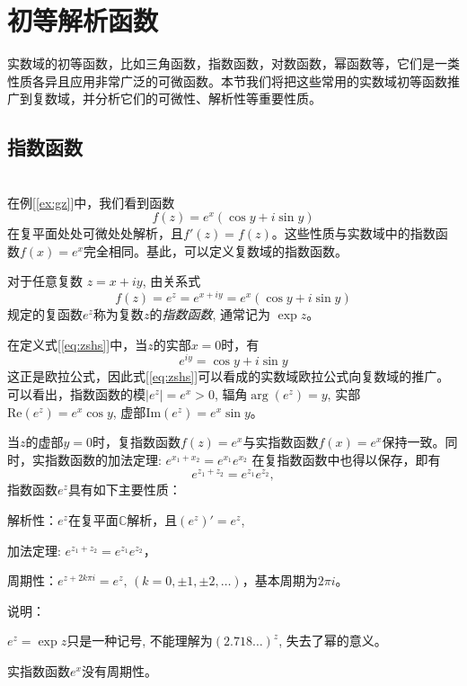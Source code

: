 \section{初等解析函数}\label{}
实数域的初等函数，比如三角函数，指数函数，对数函数，幂函数等，它们是一类性质各异且应用非常广泛的可微函数。本节我们将把这些常用的实数域初等函数推广到复数域，并分析它们的可微性、解析性等重要性质。\\

\subsection{指数函数}
~\\
在例[\ref{ex:gz}]中，我们看到函数
\[ f(z) = e^x (\cos y + i \sin y) \]
在复平面处处可微处处解析，且$f'(z) = f(z)$。这些性质与实数域中的指数函数$f(x) = e^x$完全相同。基此，可以定义复数域的指数函数。
\begin{definition}\index{}
	对于任意复数 $z= x +iy $, 由关系式
  \begin{equation}\label{eq:zshs}
    f(z) = e^z = e^{x+iy}  = e^x (\cos y + i \sin y) 
  \end{equation} 
规定的复函数$e^z$称为复数$z$的\emph{指数函数}, 通常记为 $\exp {z}$。
\end{definition}
在定义式[\ref{eq:zshs}]中，当$z$的实部$x=0$时，有 
\begin{equation}
  e^{iy}  = \cos y + i \sin y 
\end{equation} 
这正是欧拉公式，因此式[\ref{eq:zshs}]可以看成的实数域欧拉公式向复数域的推广。
可以看出，指数函数的模$|e^z| = e^x > 0$, 辐角$\arg (e^z) = y $, 实部$\text{Re}(e^z) = e^x \cos y$, 虚部$\text{Im}(e^z) = e^x \sin y$。

当$z$的虚部$y=0$时，复指数函数$f(z)= e^x$与实指数函数$f(x) = e^x$保持一致。同时，实指数函数的加法定理: $e^{x_1+x_2} = e^{x_1} e^{x_2}$ 在复指数函数中也得以保存，即有
\begin{equation}
  e^{z_1+z_2} = e^{z_1} e^{z_2},
\end{equation}
指数函数$e^z$具有如下主要性质：
\begin{compactenum}[(a)]
	\item 解析性：$e^z$在复平面$\mathbb{C}$解析，且$(e^z)' = e^z$,
	\item 加法定理:  $e^{z_1+z_2} = e^{z_1} e^{z_2}$，
	\item 周期性：$e^{z+2k\pi i } = e^{z}, \, (k=0, \pm 1, \pm 2, \dots)$，基本周期为$2\pi i$。
\end{compactenum}
说明：
\begin{compactenum}[(i)]
	\item $e^z= \exp {z}$只是一种记号, 不能理解为$(2.718\dots)^z$, 失去了幂的意义。
	\item 实指数函数$e^x$没有周期性。
\end{compactenum}


